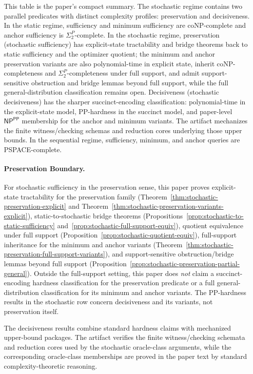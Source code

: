 This table is the paper's compact summary. The stochastic regime contains two parallel predicates with distinct complexity profiles: preservation and decisiveness. In the static regime, sufficiency and minimum sufficiency are coNP-complete and anchor sufficiency is $\Sigma_2^P$-complete. In the stochastic regime, preservation (stochastic sufficiency) has explicit-state tractability and bridge theorems back to static sufficiency and the optimizer quotient; the minimum and anchor preservation variants are also polynomial-time in explicit state, inherit coNP-completeness and $\Sigma_2^P$-completeness under full support, and admit support-sensitive obstruction and bridge lemmas beyond full support, while the full general-distribution classification remains open. Decisiveness (stochastic decisiveness) has the sharper succinct-encoding classification: polynomial-time in the explicit-state model, PP-hardness in the succinct model, and paper-level $\textsf{NP}^{\textsf{PP}}$ membership for the anchor and minimum variants. The artifact mechanizes the finite witness/checking schemas and reduction cores underlying those upper bounds. In the sequential regime, sufficiency, minimum, and anchor queries are PSPACE-complete.

\paragraph{Preservation Boundary.}
For stochastic sufficiency in the preservation sense, this paper proves explicit-state tractability for the preservation family (Theorem~\ref{thm:stochastic-preservation-explicit} and Theorem~\ref{thm:stochastic-preservation-variants-explicit}), static-to-stochastic bridge theorems (Propositions~\ref{prop:stochastic-to-static-sufficiency} and~\ref{prop:stochastic-full-support-equiv}), quotient equivalence under full support (Proposition~\ref{prop:stochastic-quotient-equiv}), full-support inheritance for the minimum and anchor variants (Theorem~\ref{thm:stochastic-preservation-full-support-variants}), and support-sensitive obstruction/bridge lemmas beyond full support (Proposition~\ref{prop:stochastic-preservation-partial-general}). Outside the full-support setting, this paper does \emph{not} claim a succinct-encoding hardness classification for the preservation predicate or a full general-distribution classification for its minimum and anchor variants. The PP-hardness results in the stochastic row concern decisiveness and its variants, not preservation itself.

The decisiveness results combine standard hardness claims with mechanized upper-bound packages. The artifact verifies the finite witness/checking schemata and reduction cores used by the stochastic oracle-class arguments, while the corresponding oracle-class memberships are proved in the paper text by standard complexity-theoretic reasoning.

